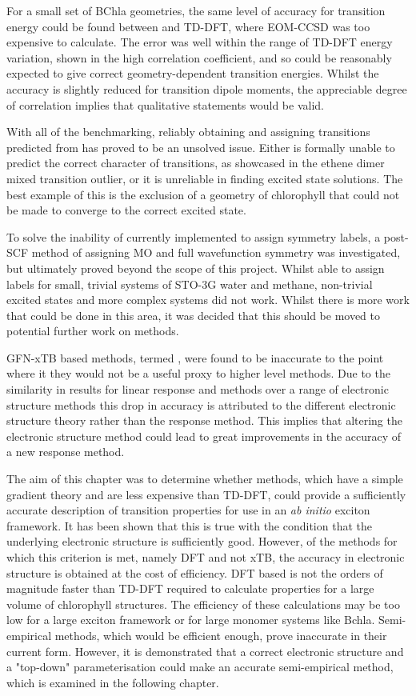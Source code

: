 For a small set of BChla geometries, the same level of accuracy for transition energy 
could be found between \dscf and TD-DFT, where EOM-CCSD was too expensive to calculate.
The error was well within the range of TD-DFT energy variation, shown in the high
correlation coefficient, and so \dscf could be reasonably expected to give correct
geometry-dependent transition energies. Whilst the accuracy is slightly reduced 
for transition dipole moments, the appreciable degree of correlation implies that
qualitative statements would be valid.

With all of the benchmarking, reliably obtaining and assigning transitions predicted 
from \dscf has proved to be an unsolved issue. Either \dscf is formally unable to
predict the correct character of transitions, as showcased in the ethene dimer mixed
transition outlier, or it is unreliable in finding excited state solutions. The 
best example of this is  the exclusion of a geometry of chlorophyll that could not
be made to converge to the correct excited state.

To solve the inability of currently implemented \dscf to assign symmetry labels,
a post-SCF method of assigning MO and full wavefunction symmetry was investigated,
but ultimately proved beyond the scope of this project. Whilst able to assign labels
for small, trivial systems of STO-3G water and methane, non-trivial excited states
and more complex systems did not work. Whilst there is more work that could be done
in this area, it was decided that this should be moved to potential further work
on \dscf methods.

GFN-xTB based methods, termed \dxtb, were found to be inaccurate to the point where
it they would not be a useful proxy to higher level methods. Due to the similarity
in results for linear response and \dscf methods over a range of electronic structure
methods this drop in accuracy is attributed to the different electronic structure 
theory rather than the response method. This implies that altering the electronic
structure method could lead to great improvements in the accuracy of a new response 
method.

The aim of this chapter was to determine whether \dscf methods, which have a simple
gradient theory and are less expensive than TD-DFT, could provide a sufficiently accurate
description of transition properties for use in an \emph{ab initio} exciton framework.
It has been shown that this is true with the condition that the underlying electronic
structure is sufficiently good. However, of the methods for which this criterion 
is met, namely DFT and not xTB, the accuracy in electronic structure is obtained 
at the cost of efficiency. DFT based \dscf is not the orders of magnitude faster 
than TD-DFT required to calculate properties for a large volume of chlorophyll structures. 
The efficiency of these calculations may be too low for a large exciton framework 
or for large monomer systems like Bchla. Semi-empirical \dscf methods, which would 
be efficient enough, prove inaccurate in their current form. However, it is demonstrated 
that a correct electronic structure and a "top-down" parameterisation could make 
an accurate semi-empirical method, which is examined in the following chapter.
